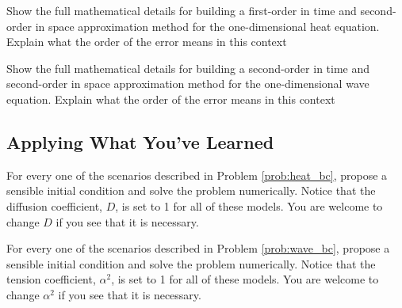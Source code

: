 \begin{problem}
    Show the full mathematical details for building a first-order in time and
    second-order in space approximation method for the
    one-dimensional heat equation.  Explain what the order of the error means in this
    context
\end{problem}

\begin{problem}
    Show the full mathematical details for building a second-order in time and
    second-order in space approximation method for the
    one-dimensional wave equation.  Explain what the order of the error means in this
    context
\end{problem}


\subsection{Applying What You've Learned}

\begin{problem}
    For every one of the scenarios described in Problem \ref{prob:heat_bc}, propose a
    sensible initial condition and solve the problem numerically.  Notice that the
    diffusion coefficient, $D$, is set to 1 for all of these models.  You are welcome to
    change $D$ if you see that it is necessary.
\end{problem}

\begin{problem}
    For every one of the scenarios described in Problem \ref{prob:wave_bc}, propose a
    sensible initial condition and solve the problem numerically.  Notice that the
    tension coefficient, $\alpha^2$, is set to 1 for all of these models.  You are welcome to
    change $\alpha^2$ if you see that it is necessary.
\end{problem}

